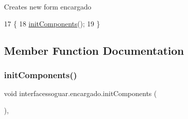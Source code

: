 Creates new form encargado 
\begin{DoxyCode}
17                        \{
18         \mbox{\hyperlink{classinterfacessoguar_1_1encargado_ac178104196403dd279dd6b1ebe64b227}{initComponents}}();
19     \}
\end{DoxyCode}


\subsection{Member Function Documentation}
\mbox{\label{classinterfacessoguar_1_1encargado_ac178104196403dd279dd6b1ebe64b227}} 
\subsubsection{\texorpdfstring{init\+Components()}{initComponents()}}
{\footnotesize\ttfamily void interfacessoguar.\+encargado.\+init\+Components (\begin{DoxyParamCaption}{ }\end{DoxyParamCaption})\hspace{0.3cm}{\ttfamily [inline]}, {\ttfamily [private]}}

